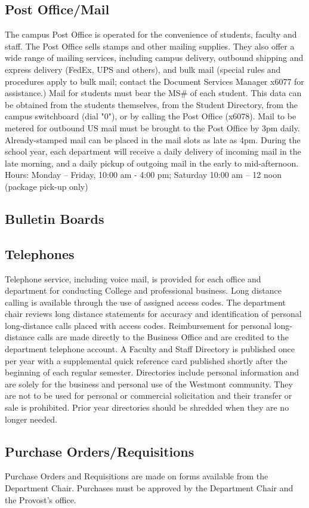 \documentclass[letterpaper, 11pt]{article}
\begin{document}
	\subsection{Post Office/Mail}
		The campus Post Office is operated for the convenience of students, faculty and staff. The Post Office sells stamps and other mailing supplies. They also offer a wide range of mailing services, including campus delivery, outbound shipping and express delivery (FedEx, UPS and others), and bulk mail (special rules and procedures apply to bulk mail; contact the Document Services Manager x6077 for assistance.)
		Mail for students must bear the MS\# of each student. This data can be obtained from the students themselves, from the Student Directory, from the campus switchboard (dial "0"), or by calling the Post Office (x6078).
		Mail to be metered for outbound US mail must be brought to the Post Office by 3pm daily. Already-stamped mail can be placed in the mail slots as late as 4pm. During the school year, each department will receive a daily delivery of incoming mail in the late morning, and a daily pickup of outgoing mail in the early to mid-afternoon.
		Hours:  Monday -- Friday, 10:00 am - 4:00 pm; Saturday 10:00 am -- 12 noon (package pick-up only)
	\subsection{Bulletin Boards}
	\subsection{Telephones}
		Telephone service, including voice mail, is provided for each office and department for conducting College and professional business.  Long distance calling is available through the use of assigned access codes.  The department chair reviews long distance statements for accuracy and identification of personal long-distance calls placed with access codes.  Reimbursement for personal long-distance calls are made directly to the Business Office and are credited to the department telephone account.  A Faculty and Staff Directory is published once per year with a supplemental quick reference card published shortly after the beginning of each regular semester.  Directories include personal information and are solely for the business and personal use of the Westmont community.  They are not to be used for personal or commercial solicitation and their transfer or sale is prohibited.  Prior year directories should be shredded when they are no longer needed.
	\subsection{Purchase Orders/Requisitions}
		Purchase Orders and Requisitions are made on forms available from the Department Chair.  Purchases must be approved by the Department Chair and the Provost's office.
\end{document}
